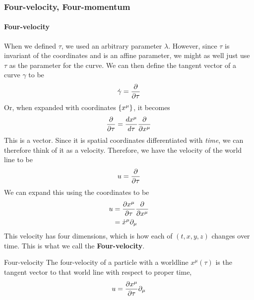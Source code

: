 

	\subsubsection{Four-velocity, Four-momentum}
		\paragraph{Four-velocity}
		When we defined $\tau$, we used an arbitrary parameter $\lambda$.
		However, since $\tau$ is invariant of the coordinates and is an affine
		parameter, we might as well just use $\tau$
		as the parameter for the curve. We can then define the tangent vector 
		of a curve $\gamma$ to be
		\[
			\dot{\gamma} = \pdv{}{\tau} 
		\]
		Or, when expanded with coordinates $\qty{x^\mu}$, it becomes
		\[
			\pdv{}{\tau} = \dv{x^\mu}{\tau} \pdv{}{x^\mu}   
		\]
		This is a vector. Since it is spatial coordinates differentiated with \textit{time},
		we can therefore think of it as a velocity. Therefore, we have
		the velocity of the world line to be
		\[
			u = \pdv{}{\tau} 
		\]
		We can expand this using the coordinates to be
		\begin{align*}
			u &= \pdv{x^\mu}{\tau} \pdv{}{x^\mu}  \\
			  &= \dot x^\mu \partial_\mu
		\end{align*}
		This velocity has four dimensions, which is 
		how each of $(t,x,y,z)$ changes over time. This is
		what we call the \textbf{Four-velocity}.
		\begin{definition}{Four-velocity}
		    The four-velocity of a particle with a worldline 
			$x^\mu(\tau)$ is the tangent vector to that world line
			with respect to proper time,
			\[
				u = \pdv{x^\mu}{\tau} \partial_\mu 
			\]
		\end{definition}
			
